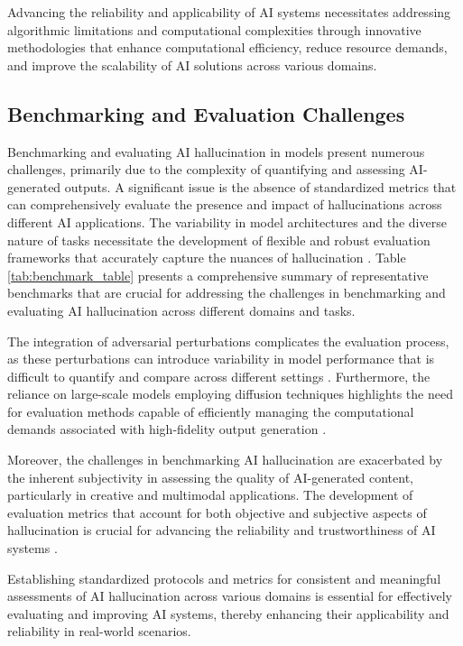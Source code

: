 Advancing the reliability and applicability of AI systems necessitates addressing algorithmic limitations and computational complexities through innovative methodologies that enhance computational efficiency, reduce resource demands, and improve the scalability of AI solutions across various domains.


\subsection{Benchmarking and Evaluation Challenges} \label{subsec:Benchmarking and Evaluation Challenges}



Benchmarking and evaluating AI hallucination in models present numerous challenges, primarily due to the complexity of quantifying and assessing AI-generated outputs. A significant issue is the absence of standardized metrics that can comprehensively evaluate the presence and impact of hallucinations across different AI applications. The variability in model architectures and the diverse nature of tasks necessitate the development of flexible and robust evaluation frameworks that accurately capture the nuances of hallucination \cite{dhariwal2021diffusion}. Table \ref{tab:benchmark_table} presents a comprehensive summary of representative benchmarks that are crucial for addressing the challenges in benchmarking and evaluating AI hallucination across different domains and tasks.

The integration of adversarial perturbations complicates the evaluation process, as these perturbations can introduce variability in model performance that is difficult to quantify and compare across different settings \cite{zhang2024universaladversarialperturbationsvisionlanguage}. Furthermore, the reliance on large-scale models employing diffusion techniques highlights the need for evaluation methods capable of efficiently managing the computational demands associated with high-fidelity output generation \cite{rombach2022high}.

Moreover, the challenges in benchmarking AI hallucination are exacerbated by the inherent subjectivity in assessing the quality of AI-generated content, particularly in creative and multimodal applications. The development of evaluation metrics that account for both objective and subjective aspects of hallucination is crucial for advancing the reliability and trustworthiness of AI systems \cite{BLIP:Boots6}.

Establishing standardized protocols and metrics for consistent and meaningful assessments of AI hallucination across various domains is essential for effectively evaluating and improving AI systems, thereby enhancing their applicability and reliability in real-world scenarios.










